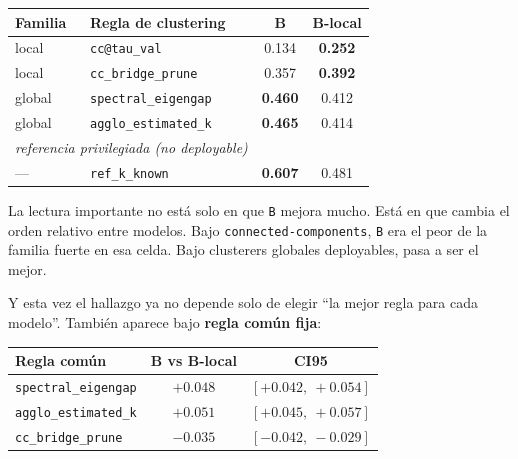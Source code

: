 \documentclass[11pt]{article}
\begin{document}
\begin{table}[H]
\centering
\sffamily\small
\begin{tabular}{llcc}
\headrow \textbf{Familia} & \textbf{Regla de clustering} & \textbf{B} & \textbf{B-local} \\
\midrule
local  & \texttt{cc@tau\_val}        & 0.134 & \textbf{0.252} \\
local  & \texttt{cc\_bridge\_prune}  & 0.357 & \textbf{0.392} \\
global & \texttt{spectral\_eigengap} & \textbf{0.460} & 0.412 \\
global & \texttt{agglo\_estimated\_k}& \textbf{0.465} & 0.414 \\
\midrule
\multicolumn{2}{l}{\itshape referencia privilegiada (no deployable)} & & \\
---    & \texttt{ref\_k\_known}      & \textbf{0.607} & 0.481 \\
\bottomrule
\end{tabular}
\end{table}

La lectura importante no está solo en que \texttt{B} mejora mucho. Está en que cambia el orden relativo entre modelos. Bajo \texttt{connected-components}, \texttt{B} era el peor de la familia fuerte en esa celda. Bajo clusterers globales deployables, pasa a ser el mejor.

Y esta vez el hallazgo ya no depende solo de elegir ``la mejor regla para cada modelo''. También aparece bajo \textbf{regla común fija}:

\begin{table}[H]
\centering
\sffamily\small
\begin{tabular}{lcc}
\headrow \textbf{Regla común} & \textbf{B vs B-local} & \textbf{CI95} \\
\midrule
\texttt{spectral\_eigengap}  & {\color{accent}\bfseries $+0.048$} & {\color{accent}$[+0.042,\ +0.054]$} \\
\texttt{agglo\_estimated\_k} & {\color{accent}\bfseries $+0.051$} & {\color{accent}$[+0.045,\ +0.057]$} \\
\midrule
\texttt{cc\_bridge\_prune}   & {\color{alertred}\bfseries $-0.035$} & {\color{alertred}$[-0.042,\ -0.029]$} \\
\bottomrule
\end{tabular}
\end{table}
\end{document}
